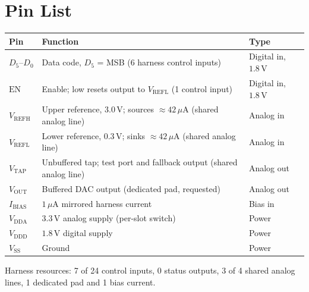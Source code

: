 \documentclass[10pt,a4paper]{article}
\newcommand{\vrefh}{\ensuremath{V_{\mathrm{REFH}}}}
\newcommand{\vrefl}{\ensuremath{V_{\mathrm{REFL}}}}
\newcommand{\vtap}{\ensuremath{V_{\mathrm{TAP}}}}
\newcommand{\vout}{\ensuremath{V_{\mathrm{OUT}}}}
\newcommand{\vdda}{\ensuremath{V_{\mathrm{DDA}}}}
\newcommand{\vddd}{\ensuremath{V_{\mathrm{DDD}}}}
\newcommand{\vssa}{\ensuremath{V_{\mathrm{SS}}}}
\newcommand{\ibias}{\ensuremath{I_{\mathrm{BIAS}}}}
\newcommand{\en}{\ensuremath{\mathrm{EN}}}
\newcommand{\dbus}{\ensuremath{D_5\text{--}D_0}}
\begin{document}
\section{Pin List}
\begin{table}[H]
  \centering
  \begin{tabular}{@{}l l l@{}}
    \toprule
    \textbf{Pin} & \textbf{Function} & \textbf{Type} \\
    \midrule
    \dbus       & Data code, $D_5$ = MSB (6 harness control inputs)              & Digital in, $1.8\,\mathrm{V}$ \\
    \en         & Enable; low resets output to \vrefl{} (1 control input)        & Digital in, $1.8\,\mathrm{V}$ \\
    \vrefh      & Upper reference, $3.0\,\mathrm{V}$; sources $\approx 42\,\mu\mathrm{A}$ (shared analog line) & Analog in \\
    \vrefl      & Lower reference, $0.3\,\mathrm{V}$; sinks $\approx 42\,\mu\mathrm{A}$ (shared analog line)   & Analog in \\
    \vtap       & Unbuffered tap; test port and fallback output (shared analog line) & Analog out \\
    \vout       & Buffered DAC output (dedicated pad, requested)                 & Analog out \\
    \ibias      & $1\,\mu\mathrm{A}$ mirrored harness current                     & Bias in \\
    \vdda       & $3.3\,\mathrm{V}$ analog supply (per-slot switch)              & Power \\
    \vddd       & $1.8\,\mathrm{V}$ digital supply                               & Power \\
    \vssa        & Ground                                                         & Power \\
    \bottomrule
  \end{tabular}
\end{table}

Harness resources: 7 of 24 control inputs, 0 status outputs, 3 of 4 shared analog lines, 1 dedicated pad and 1 bias current.

\end{document}
